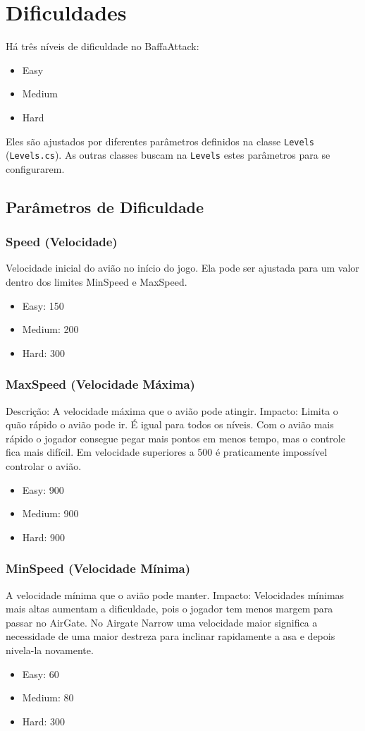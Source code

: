 \chapter{Dificuldades}
Há três níveis de dificuldade no BaffaAttack:
\begin{itemize}
    \item Easy
    \item Medium
    \item Hard
\end{itemize}

Eles são ajustados por diferentes parâmetros definidos na classe \texttt{Levels} (\texttt{Levels.cs}). As outras classes buscam na \texttt{Levels} estes parâmetros para se configurarem.

\section*{Parâmetros de Dificuldade}
\subsection*{Speed (Velocidade)}
Velocidade inicial do avião no início do jogo. Ela pode ser ajustada para um valor dentro dos limites MinSpeed e MaxSpeed.
\begin{itemize}
    \item Easy: 150
    \item Medium: 200
    \item Hard: 300
\end{itemize}

\subsection*{MaxSpeed (Velocidade Máxima)}
Descrição: A velocidade máxima que o avião pode atingir.
Impacto: Limita o quão rápido o avião pode ir. É igual para todos os níveis. Com o avião mais rápido o jogador consegue pegar mais pontos em menos tempo, mas o controle fica mais difícil. Em velocidade superiores a 500 é praticamente impossível controlar o avião.
\begin{itemize}
    \item Easy: 900
    \item Medium: 900
    \item Hard: 900
\end{itemize}

\subsection*{MinSpeed (Velocidade Mínima)}
A velocidade mínima que o avião pode manter.
Impacto: Velocidades mínimas mais altas aumentam a dificuldade, pois o jogador tem menos margem para passar no AirGate. 
No Airgate Narrow uma velocidade maior significa a necessidade de uma maior destreza para inclinar rapidamente a asa e depois nivela-la novamente.
\begin{itemize}
    \item Easy: 60
    \item Medium: 80
    \item Hard: 300
\end{itemize}

